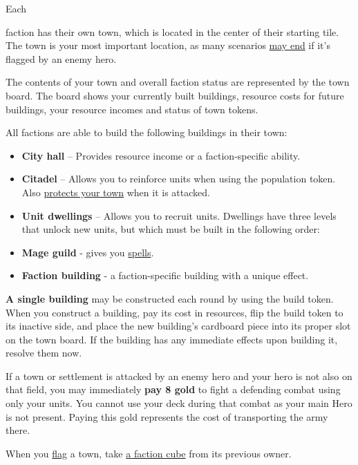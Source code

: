 \hypertarget{Town}{Each} faction has their own town, which is located in the center of their starting tile. The town is your most important location, as many scenarios \hyperlink{End}{may end} if it's flagged by an enemy hero.\par
The contents of your town and overall faction status are represented by the town board. The board shows your currently built buildings, resource costs for future buildings, your resource incomes and status of town tokens.\par
All factions are able to build the following buildings in their town:
\begin{itemize}
  \item \textbf{City hall} – Provides resource income or a faction-specific ability.
  \item \textbf{Citadel} – Allows you to reinforce units when using the population token. Also \hyperlink{Walls}{protects your town} when it is attacked.
  \item \textbf{Unit dwellings} – Allows you to recruit units. Dwellings have three levels that unlock new units, but which must be built in the following order:
  \item \textbf{Mage guild} - gives you \hyperlink{spells}{spells}.
  \item \textbf{Faction building} - a faction-specific building with a unique effect.
\end{itemize}
\textbf{A single building} may be constructed each round by using the build token. When you construct a building, pay its cost in resources, flip the build token to its inactive side, and place the new building’s cardboard piece into its proper slot on the town board. If the building has any immediate effects upon building it, resolve them now.\par
If a town or settlement is attacked by an enemy hero and your hero is not also on that field, you may immediately \textbf{pay 8 gold} to fight a defending combat using only your units. You cannot use your deck during that combat as your main Hero is not present. Paying this gold represents the cost of transporting the army there.\par
When you \hyperlink{Categories}{flag} a town, take \hyperlink{End}{a faction cube} from its previous owner.
